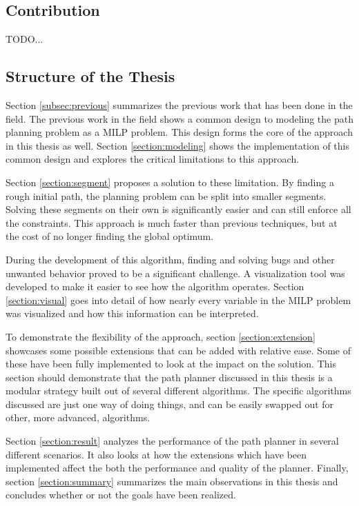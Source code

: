 \subsection{Contribution}
TODO...
\subsection{Structure of the Thesis}
Section \ref{subsec:previous} summarizes the previous work that has been done in the field.
The previous work in the field shows a common design to modeling the path planning problem as a MILP problem. This design forms the core of the approach in this thesis as well. Section \ref{section:modeling} shows the implementation of this common design and explores the critical limitations to this approach.
\par
Section \ref{section:segment} proposes a solution to these limitation. By finding a rough initial path, the planning problem can be split into smaller segments. Solving these segments on their own is significantly easier and can still enforce all the constraints. This approach is much faster than previous techniques, but at the cost of no longer finding the global optimum.
\par
During the development of this algorithm, finding and solving bugs and other unwanted behavior proved to be a significant challenge. A visualization tool was developed to make it easier to see how the algorithm operates. Section \ref{section:visual} goes into detail of how nearly every variable in the MILP problem was visualized and how this information can be interpreted.
\par
To demonstrate the flexibility of the approach, section \ref{section:extension} showcases some possible extensions that can be added with relative ease. Some of these have been fully implemented to look at the impact on the solution. This section should demonstrate that the path planner discussed in this thesis is a modular strategy built out of several different algorithms. The specific algorithms discussed are just one way of doing things, and can be easily swapped out for other, more advanced, algorithms. 
\par
Section \ref{section:result} analyzes the performance of the path planner in several different scenarios. It also looks at how the extensions which have been implemented affect the both the performance and quality of the planner.
Finally, section \ref{section:summary} summarizes the main observations in this thesis and concludes whether or not the goals have been realized.


